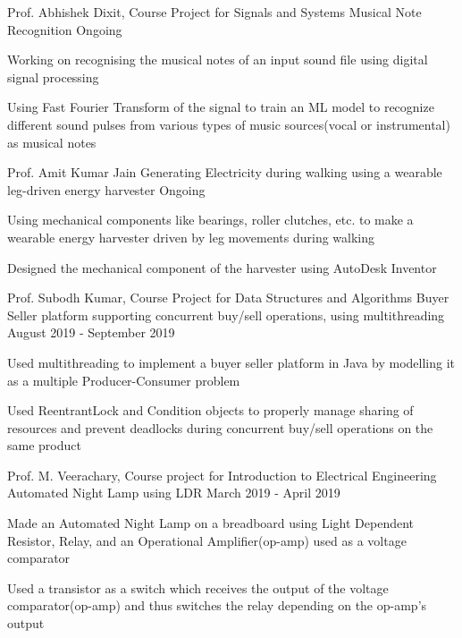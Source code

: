 
\begin{cventries}
  \cventry
    {Prof. Abhishek Dixit, Course Project for Signals and Systems}
    {Musical Note Recognition} %
    {} %
    {Ongoing} %
    {
      \begin{cvitems} %
        \item {Working on recognising the musical notes of an input sound file using digital signal processing}
        \item {Using Fast Fourier Transform of the signal to train an ML model to recognize different sound pulses from various types of music sources(vocal or instrumental) as musical notes}
      \end{cvitems}
    }

  \cventry
    {Prof. Amit Kumar Jain}
    {Generating Electricity during walking using a wearable leg-driven energy harvester}
    {}
    {Ongoing}
    {
      \begin{cvitems}
        \item {Using mechanical components like bearings, roller clutches, etc. to make a wearable energy harvester driven by leg movements during walking}
        \item {Designed the mechanical component of the harvester using AutoDesk Inventor}
      \end{cvitems}
    }

  \cventry
    {Prof. Subodh Kumar, Course Project for Data Structures and Algorithms}
    {Buyer Seller platform supporting concurrent buy/sell operations, using multithreading} %
    {}
    {August 2019 - September 2019} %
    {
      \begin{cvitems} %
      	\item {Used multithreading to implement a buyer seller platform in Java by modelling it as a multiple Producer-Consumer problem}
      	\item {Used ReentrantLock and Condition objects to properly manage sharing of resources and prevent deadlocks during concurrent buy/sell operations on the same product}
      \end{cvitems}
    }

  \cventry
    {Prof. M. Veerachary, Course project for Introduction to Electrical Engineering}
    {Automated Night Lamp using LDR}
    {}
    {March 2019 - April 2019}
    {
      \begin{cvitems}
        \item {Made an Automated Night Lamp on a breadboard using Light Dependent Resistor, Relay, and an Operational Amplifier(op-amp) used as a voltage comparator}
        \item {Used a transistor as a switch which receives the output of the voltage comparator(op-amp) and thus switches the relay depending on the op-amp's output}
      \end{cvitems}
    }


\end{cventries}
